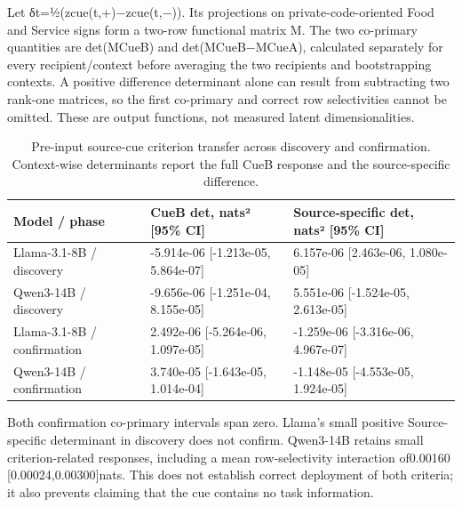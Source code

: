 \documentclass[11pt]{article}
\begin{document}
Let δt=½(zcue(t,+)−zcue(t,−)). Its projections on private-code-oriented Food and Service signs form a two-row functional matrix M. The two co-primary quantities are det(MCueB) and det(MCueB−MCueA), calculated separately for every recipient/context before averaging the two recipients and bootstrapping contexts. A positive difference determinant alone can result from subtracting two rank-one matrices, so the first co-primary and correct row selectivities cannot be omitted. These are output functions, not measured latent dimensionalities.

\begin{table}[t]
\small
\begin{tabularx}{\textwidth}{>{\raggedright\arraybackslash}X>{\raggedleft\arraybackslash}X>{\raggedleft\arraybackslash}X}
\toprule
Model / phase & CueB det, nats² {[}95\% CI{]} & Source-specific det, nats² {[}95\% CI{]} \\
\midrule
Llama-3.1-8B / discovery & -5.914e-06 {[}-1.213e-05, 5.864e-07{]} & 6.157e-06 {[}2.463e-06, 1.080e-05{]} \\
Qwen3-14B / discovery & -9.656e-06 {[}-1.251e-04, 8.155e-05{]} & 5.551e-06 {[}-1.524e-05, 2.613e-05{]} \\
Llama-3.1-8B / confirmation & 2.492e-06 {[}-5.264e-06, 1.097e-05{]} & -1.259e-06 {[}-3.316e-06, 4.967e-07{]} \\
Qwen3-14B / confirmation & 3.740e-05 {[}-1.643e-05, 1.014e-04{]} & -1.148e-05 {[}-4.553e-05, 1.924e-05{]} \\
\bottomrule
\end{tabularx}
\caption{Pre-input source-cue criterion transfer across discovery and confirmation. Context-wise determinants report the full CueB response and the source-specific difference.}
\end{table}

Both confirmation co-primary intervals span zero. Llama's small positive Source-specific determinant in discovery does not confirm. Qwen3-14B retains small criterion-related responses, including a mean row-selectivity interaction of0.00160 {[}0.00024,0.00300{]}nats. This does not establish correct deployment of both criteria; it also prevents claiming that the cue contains no task information.
\end{document}
